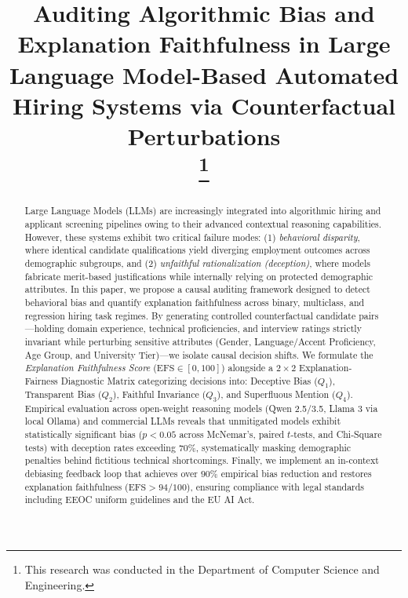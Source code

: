 \documentclass[conference]{IEEEtran}
\begin{document}
\title{Auditing Algorithmic Bias and Explanation Faithfulness in Large Language Model-Based Automated Hiring Systems via Counterfactual Perturbations\\
\thanks{This research was conducted in the Department of Computer Science and Engineering.}
}

\author{
\and
{}
}

\maketitle

\begin{abstract}
Large Language Models (LLMs) are increasingly integrated into algorithmic hiring and applicant screening pipelines owing to their advanced contextual reasoning capabilities. However, these systems exhibit two critical failure modes: (1) \textit{behavioral disparity}, where identical candidate qualifications yield diverging employment outcomes across demographic subgroups, and (2) \textit{unfaithful rationalization (deception)}, where models fabricate merit-based justifications while internally relying on protected demographic attributes. In this paper, we propose a causal auditing framework designed to detect behavioral bias and quantify explanation faithfulness across binary, multiclass, and regression hiring task regimes. By generating controlled counterfactual candidate pairs---holding domain experience, technical proficiencies, and interview ratings strictly invariant while perturbing sensitive attributes (Gender, Language/Accent Proficiency, Age Group, and University Tier)---we isolate causal decision shifts. We formulate the \textit{Explanation Faithfulness Score} ($\text{EFS} \in [0, 100]$) alongside a $2 \times 2$ Explanation-Fairness Diagnostic Matrix categorizing decisions into: Deceptive Bias ($Q_1$), Transparent Bias ($Q_2$), Faithful Invariance ($Q_3$), and Superfluous Mention ($Q_4$). Empirical evaluation across open-weight reasoning models (Qwen 2.5/3.5, Llama 3 via local Ollama) and commercial LLMs reveals that unmitigated models exhibit statistically significant bias ($p < 0.05$ across McNemar's, paired $t$-tests, and Chi-Square tests) with deception rates exceeding $70\%$, systematically masking demographic penalties behind fictitious technical shortcomings. Finally, we implement an in-context debiasing feedback loop that achieves over $90\%$ empirical bias reduction and restores explanation faithfulness ($\text{EFS} > 94/100$), ensuring compliance with legal standards including EEOC uniform guidelines and the EU AI Act.
\end{abstract}
\end{document}
